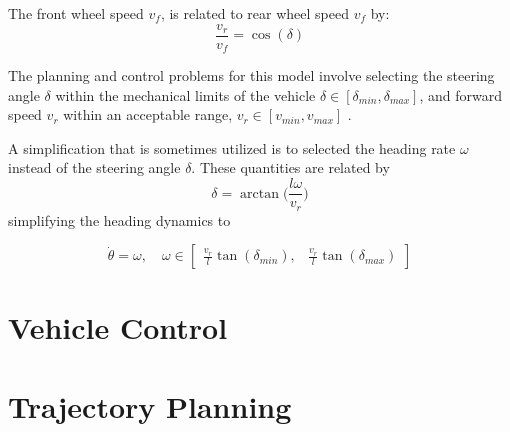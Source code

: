 \documentclass[11]{article}
\begin{document}
The front wheel speed $v_f$, is related to rear wheel speed $v_f$ by: 
\begin{equation}
\frac{v_r}{v_f} = \cos (\delta)
\end{equation}

The planning and control problems for this model involve selecting the steering angle $\delta$ within the mechanical limits of the vehicle $\delta \in [\delta_{min}, \delta_{max}]$, and forward speed $v_r$ within an acceptable range, $v_r \in [v_{min}, v_{max}]$ \cite{paden2016survey}.

A simplification that is sometimes utilized is to selected the heading rate $\omega$ instead of the steering angle $\delta$. These quantities are related by 
\begin{equation}
	\delta = \arctan \Big ( \frac{l\omega}{v_r}\Big )
\end{equation}
simplifying the heading dynamics to 

\begin{equation}
	\dot{\theta} = \omega, \quad 
	\omega \in \begin{bmatrix}
 		 \frac{v_r}{l} \tan (\delta_{min}), & \frac{v_r}{l} \tan (\delta_{max})
	\end{bmatrix}
\end{equation}


\section{Vehicle Control}

\section{Trajectory Planning} 



\end{document}
